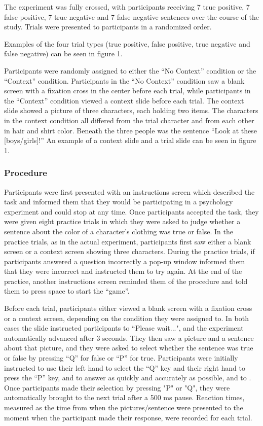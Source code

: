 \documentclass[10pt,letterpaper]{article}
\begin{document}
The experiment was fully crossed, with participants receiving 7 true positive, 7 false positive, 7 true negative and 7 false negative sentences over the course of the study.  Trials were presented to participants in a randomized order.

Examples of the four trial types (true positive, false positive, true negative and false negative) can be seen in figure 1.    

Participants were randomly assigned to either the ``No Context'' condition or the ``Context'' condition.  Participants in the ``No Context'' condition saw a blank screen with a fixation cross in the center before each trial, while participants in the ``Context'' condition viewed a context slide before each trial.  The context slide showed a picture of three characters, each holding two items.  The characters in the context condition all differed from the trial character and from each other in hair and shirt color.  Beneath the three people was the sentence ``Look at these [boys/girls]!''  An example of a context slide and a trial slide can be seen in figure 1.  


\subsubsection{Procedure}

Participants were first presented with an instructions screen which described the task and informed them that they would be participating in a psychology experiment and could stop at any time.  Once participants accepted the task, they were given eight practice trials in which they were asked to judge whether a sentence about the color of a character's clothing was true or false.  In the practice trials, as in the actual experiment, participants first saw either a blank screen or a context screen showing three characters.  During the practice trials, if participants answered a question incorrectly a pop-up window informed them that they were incorrect and instructed them to try again.  At the end of the practice, another instructions screen reminded them of the procedure and told them to press space to start the ``game''.  

Before each trial, participants either viewed a blank screen with a fixation cross or a context screen, depending on the condition they were assigned to.  In both cases the slide instructed participants to ``Please wait...", and the experiment automatically advanced after 3 seconds.  They then saw a picture and a sentence about that picture, and they were asked to select whether the sentence was true or false by pressing ``Q'' for false or ``P'' for true.  Participants were initially instructed to  use their left hand to select the ``Q'' key and their right hand to press the ``P'' key, and to answer as quickly and accurately as possible, and to .  Once participants made their selection by pressing "P" or "Q", they were automatically brought to the next trial after a 500 ms pause.  Reaction times, measured as the time from when the pictures/sentence were presented to the moment when the participant made their response, were recorded for each trial.
\end{document}
